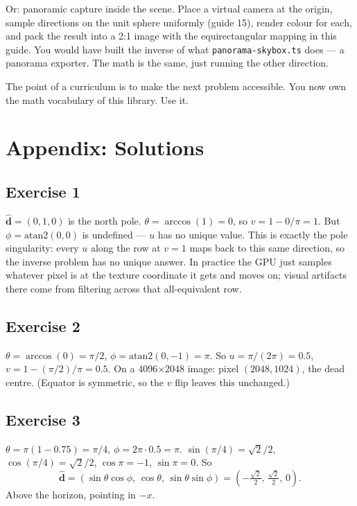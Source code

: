 \documentclass{article}
\begin{document}
Or: panoramic capture inside the scene. Place a virtual camera at the origin,
sample directions on the unit sphere uniformly (guide 15), render colour for
each, and pack the result into a 2:1 image with the equirectangular mapping
in this guide. You would have built the inverse of what
\texttt{panorama-skybox.ts} does --- a panorama exporter. The math is the
same, just running the other direction.

The point of a curriculum is to make the next problem accessible. You now own
the math vocabulary of this library. Use it.

\section{Appendix: Solutions}

\subsection*{Exercise 1}
$\hat{\mathbf{d}} = (0, 1, 0)$ is the north pole. $\theta = \arccos(1) = 0$,
so $v = 1 - 0/\pi = 1$. But $\phi = \mathrm{atan2}(0, 0)$ is undefined --- $u$
has no unique value. This is exactly the pole singularity: every $u$ along
the row at $v = 1$ maps back to this same direction, so the inverse problem
has no unique answer. In practice the GPU just samples whatever pixel is at
the texture coordinate it gets and moves on; visual artifacts there come
from filtering across that all-equivalent row.

\subsection*{Exercise 2}
$\theta = \arccos(0) = \pi/2$, $\phi = \mathrm{atan2}(0, -1) = \pi$. So
$u = \pi / (2\pi) = 0.5$, $v = 1 - (\pi/2)/\pi = 0.5$. On a 4096$\times$2048
image: pixel $(2048, 1024)$, the dead centre. (Equator is symmetric, so the
$v$ flip leaves this unchanged.)

\subsection*{Exercise 3}
$\theta = \pi (1 - 0.75) = \pi/4$, $\phi = 2\pi \cdot 0.5 = \pi$.
$\sin(\pi/4) = \sqrt{2}/2$, $\cos(\pi/4) = \sqrt{2}/2$, $\cos\pi = -1$,
$\sin\pi = 0$. So
\[
  \hat{\mathbf{d}} = (\sin\theta\cos\phi, \, \cos\theta, \, \sin\theta\sin\phi)
                   = \!\left(-\tfrac{\sqrt{2}}{2}, \, \tfrac{\sqrt{2}}{2}, \, 0\right).
\]
Above the horizon, pointing in $-x$.
\end{document}
